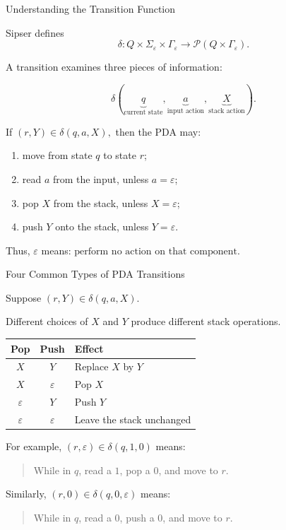 \documentclass[aspectratio=169,10pt]{beamer}
\newcommand{\eps}{\varepsilon}
\newcommand{\Pow}{\mathcal{P}}
\begin{document}
\begin{frame}{Understanding the Transition Function}

\small
Sipser defines
\[
\delta:Q\times\Sigma_{\eps}\times\Gamma_{\eps}
\longrightarrow
\Pow(Q\times\Gamma_{\eps}).
\]

A transition examines three pieces of information:

\[
\delta(
\underbrace{q}_{\text{current state}},
\underbrace{a}_{\text{input action}},
\underbrace{X}_{\text{stack action}}
).
\]

If
\(
(r,Y)\in\delta(q,a,X),
\)
then the PDA may:

\begin{enumerate}
    \item move from state \(q\) to state \(r\);
    \item read \(a\) from the input, unless \(a=\eps\);
    \item pop \(X\) from the stack, unless \(X=\eps\);
    \item push \(Y\) onto the stack, unless \(Y=\eps\).
\end{enumerate}

Thus, \(\eps\) means: \(
\boxed{\text{perform no action on that component}}.
\)

\end{frame}

\begin{frame}{Four Common Types of PDA Transitions}

\small
Suppose
\(
(r,Y)\in\delta(q,a,X).
\)

Different choices of \(X\) and \(Y\) produce different stack operations.

\begin{center}
\renewcommand{\arraystretch}{1.35}
\begin{tabular}{c|c|l}
\textbf{Pop} & \textbf{Push} & \textbf{Effect} \\ \hline
\(X\) & \(Y\) & Replace \(X\) by \(Y\) \\[0.1em]
\(X\) & \(\eps\) & Pop \(X\) \\[0.1em]
\(\eps\) & \(Y\) & Push \(Y\) \\[0.1em]
\(\eps\) & \(\eps\) & Leave the stack unchanged
\end{tabular}
\end{center}

For example,
\(
(r,\eps)\in\delta(q,1,0)
\)
means:

\begin{quote}
While in \(q\), read a \(1\), pop a \(0\), and move to \(r\).
\end{quote}

Similarly,
\(
(r,0)\in\delta(q,0,\eps)
\)
means:

\begin{quote}
While in \(q\), read a \(0\), push a \(0\), and move to \(r\).
\end{quote}

\end{frame}
\end{document}
